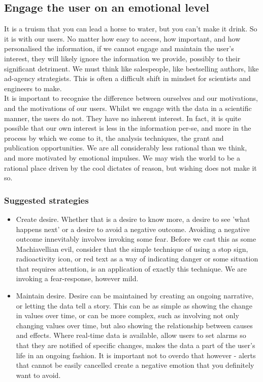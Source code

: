 \subsection{Engage the user on an emotional level}

It is a truism that you can lead a horse to water, but you can't make it drink. So it is with our users.
No matter how easy to access, how important, and how personalised the information, if we cannot engage and maintain the user's interest,
they will likely ignore the information we provide, possibly to their significant detriment.
We must think like salespeople, like bestselling authors, like ad-agency strategists.
This is often a difficult shift in mindset for scientists and engineers to make.\\

It is important to recognise the difference between ourselves and our motivations, and the motivations of our users. Whilst we engage with the data in a scientific
manner, the users do not. They have no inherent interest. In fact, it is quite possible that our own interest is less in the information per-se, and more in the process
by which we come to it, the analysis techniques, the grant and publication opportunities. We are all considerably less rational than we think, and more motivated by
emotional impulses. We may wish the world to be a rational place driven by the cool dictates of reason, but wishing does not make it so. \\

\subsubsection*{Suggested strategies}

\begin{itemize}

    \item Create desire. Whether that is a desire to know more, a desire to see 'what happens next' or a desire to avoid a negative outcome.
    Avoiding a negative outcome innevitably involves invoking some fear. Before we cast this as some Machiavellian evil, consider that the simple
    technique of using a stop sign, radioactivity icon, or red text as a way of indicating danger or some situation that requires attention, is an
    application of exactly this technique. We are invoking a fear-response, however mild.

    \item Maintain desire. Desire can be maintained by creating an ongoing narrative, or letting the data tell a story. This can be as simple as showing the change in 
    values over time, or can be more complex, such as involving not only changing values over time, but also showing the relationship between causes and
    effects. Where real-time data is available, allow users to set alarms so that they are notified of specific changes, makes the data a part of the user's
    life in an ongoing fashion. It is important not to overdo that however - alerts that cannot be easily cancelled create a negative emotion that you
    definitely want to avoid.

\end{itemize}

